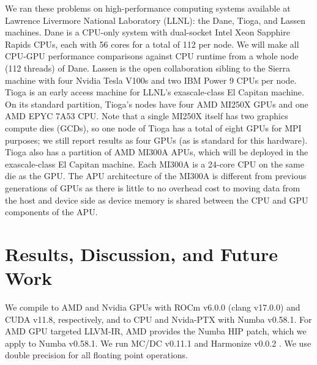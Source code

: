 We ran these problems on high-performance computing systems available at Lawrence Livermore National Laboratory (LLNL): the Dane, Tioga, and Lassen machines.
Dane is a CPU-only system with dual-socket Intel Xeon Sapphire Rapids CPUs, each with 56 cores for a total of 112 per node. 
We will make all CPU-GPU performance comparisons against CPU runtime from a whole node (112 threads) of Dane.
Lassen is the open collaboration sibling to the Sierra machine with four Nvidia Tesla V100s and two IBM Power 9 CPUs per node.
Tioga is an early access machine for LLNL's exascale-class El Capitan machine.
On its standard partition, Tioga's nodes have four AMD MI250X GPUs and one AMD EPYC 7A53 CPU.
Note that a single MI250X itself has two graphics compute dies (GCDs), so one node of Tioga has a total of eight GPUs for MPI purposes; we still report results as four GPUs (as is standard for this hardware).
Tioga also has a partition of AMD MI300A APUs, which will be deployed in the exascale-class El Capitan machine.
Each MI300A is a 24-core CPU on the same die as the GPU.
The APU architecture of the MI300A is different from previous generations of GPUs as there is little to no overhead cost to moving data from the host and device side as device memory is shared between the CPU and GPU components of the APU.

\section{Results, Discussion, and Future Work}
\label{sec:mcdc_prof:results}

We compile to AMD and Nvidia GPUs with ROCm v6.0.0 (clang v17.0.0) and CUDA v11.8, respectively, 
and to CPU and Nvida-PTX with Numba v0.58.1.
For AMD GPU targeted LLVM-IR, AMD provides the Numba HIP patch, which we apply to Numba v0.58.1. %
We run MC/DC v0.11.1 \cite{transport_cement_mcdc_2024} and Harmonize v0.0.2 \cite{harmonize}.
We use double precision for all floating point operations.

\begin{table}[ht]
    \centering
    \caption{Run time and CPU core equivalent for C5G7 (multi-group) and infinite pin-cell (continuous-energy) benchmark problems from various hardware types.}
    \label{tab:runtime}
\end{table}

